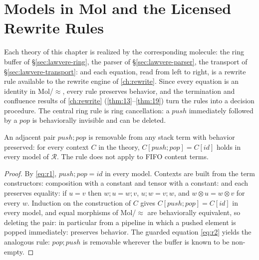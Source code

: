 \section{Models in Mol and the Licensed Rewrite Rules}\label{sec:lawvere-rewrite}

Each theory of this chapter is realized by the corresponding molecule:
the ring buffer of \S\ref{sec:lawvere-ring}, the parser of
\S\ref{sec:lawvere-parser}, the transport of
\S\ref{sec:lawvere-transport}: and each equation, read from left to
right, is a rewrite rule available to the rewrite engine of
\autoref{ch:rewrite}. Since every equation is an identity in Mol/$\approx$,
every rule preserves behavior, and the termination and confluence results
of \autoref{ch:rewrite} (\autoref{thm:13}--\autoref{thm:19}) turn the rules into a decision
procedure. The central ring rule is ring cancellation: a $\mathit{push}$
immediately followed by a $\mathit{pop}$ is behaviorally invisible and can
be deleted.

\begin{theorem}\label{thm:12}
An adjacent pair $\mathit{push};\mathit{pop}$ is removable from any stack
term with behavior preserved: for every context $C$ in the theory,
$C[\mathit{push};\mathit{pop}] = C[\mathit{id}]$ holds in every model of
$\mathcal{R}$. The rule does not apply to FIFO content terms.
\end{theorem}

\begin{proof}
By \eqref{eq:r1}, $\mathit{push};\mathit{pop} = \mathit{id}$ in every
model. Contexts are built from the term constructors: composition with a
constant and tensor with a constant: and each preserves equality: if
$u = v$ then $w;u = w;v$, $u;w = v;w$, and $w \otimes u = w \otimes v$ for
every $w$. Induction on the construction of $C$ gives
$C[\mathit{push};\mathit{pop}] = C[\mathit{id}]$ in every model, and equal
morphisms of Mol/$\approx$ are behaviorally equivalent, so deleting the
pair: in particular from a pipeline in which a pushed element is popped
immediately: preserves behavior. The guarded equation \eqref{eq:r2}
yields the analogous rule: $\mathit{pop};\mathit{push}$ is removable
wherever the buffer is known to be non-empty.
\end{proof}

